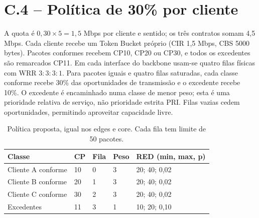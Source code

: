 \documentclass[runningheads]{llncs}
\begin{document}
\section{C.4 -- Política de 30\% por cliente}
A quota é $0,30\times5=1,5$ Mbps por cliente e sentido; os três contratos somam 4,5 Mbps. Cada cliente recebe um Token Bucket próprio (CIR 1,5 Mbps, CBS 5000 bytes). Pacotes conformes recebem CP10, CP20 ou CP30, e todos os excedentes são remarcados CP11. Em cada interface do backbone usam-se quatro filas físicas com WRR $3:3:3:1$. Para pacotes iguais e quatro filas saturadas, cada classe conforme recebe 30\% das oportunidades de transmissão e o excedente recebe 10\%. O excedente é encaminhado numa classe de menor peso; esta é uma prioridade relativa de serviço, não prioridade estrita PRI. Filas vazias cedem oportunidades, permitindo aproveitar capacidade livre.
\begin{table}[htbp]\centering\small
\caption{Política proposta, igual nos edges e core. Cada fila tem limite de 50 pacotes.}
\begin{tabular}{lllll}\hline
Classe & CP & Fila & Peso & RED (min, max, p)\\\hline
Cliente A conforme & 10 & 0 & 3 & 20; 40; 0,02\\
Cliente B conforme & 20 & 1 & 3 & 20; 40; 0,02\\
Cliente C conforme & 30 & 2 & 3 & 20; 40; 0,02\\
Excedentes & 11 & 3 & 1 & 10; 20; 0,10\\
\hline\end{tabular}\end{table}
\end{document}

